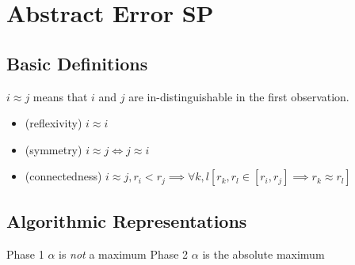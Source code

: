 \section{Abstract Error SP}
\subsection{Basic Definitions}
$i \approx j$ means that $i$ and $j$ are in-distinguishable in the first observation.
   
   
\begin{itemize}
 \item (reflexivity) $i \approx i$
  \item(symmetry) $i \approx j \iff j \approx i$
  \item(connectedness) $i \approx j , r_i < r_j \implies \forall k, l [r_k, r_l \in [r_i, r_j] \implies r_k \approx r_l ]$
\end{itemize}
\subsection{Algorithmic Representations}


\begin{algorithm}[H]
\caption{Oct 14 2021}
\label{algo1} 
\begin{algorithmic}[1]
	 \Comment Phase 1
		\Comment $\alpha$ is \emph{not} a maximum
		\Else 
		\EndIf
	\Comment Phase 2
		\Else				{} \Comment $\alpha$ is the absolute maximum
			\Else
			\EndIf
		\EndIf
	\Else
	\EndIf

\EndFor

\end{algorithmic}
\end{algorithm}




